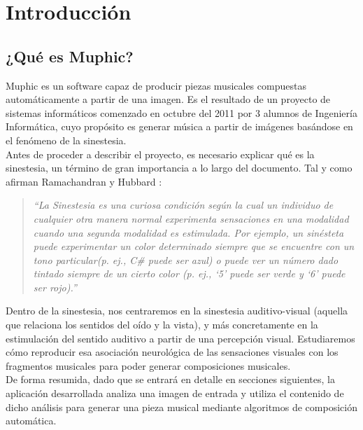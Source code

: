 \chapter{Introducción}
\label{chap:intro}



	\section{¿Qué es Muphic?}
	\label{sec:quees}
	
		\vspace{0.2in}
		Muphic es un software capaz de producir piezas musicales compuestas automáticamente a partir de una imagen. Es el resultado de un proyecto de sistemas informáticos comenzado en octubre del 2011 por 3 alumnos de Ingeniería Informática, cuyo propósito es generar música a partir de imágenes basándose en el fenómeno de la sinestesia.\\
		
		Antes de proceder a describir el proyecto, es necesario explicar qué es la sinestesia, un término de gran importancia a lo largo del documento. Tal y como afirman Ramachandran y Hubbard \cite{paperSyn}:
		
		\begin{quote}
		\emph{``La Sinestesia es una curiosa condición según la cual un individuo de cualquier otra manera normal experimenta sensaciones en una modalidad cuando una segunda modalidad es estimulada. Por ejemplo, un sinésteta puede experimentar un color determinado siempre que se encuentre con un tono particular(p. ej., C\# puede ser azul) o puede ver un número dado tintado siempre de un cierto color (p. ej., ‘5’ puede ser verde y ‘6’ puede ser rojo).''}
		\end{quote}
		
		Dentro de la sinestesia, nos centraremos en la sinestesia auditivo-visual (aquella que relaciona los sentidos del oído y la vista), y más concretamente en la estimulación del sentido auditivo a partir de una percepción visual. Estudiaremos cómo reproducir esa asociación neurológica de las sensaciones visuales con los fragmentos musicales para poder generar composiciones musicales.\\
		 
		
		De forma resumida, dado que se entrará en detalle en secciones siguientes, la aplicación desarrollada analiza una imagen de entrada y utiliza el contenido de dicho análisis para generar una pieza musical mediante algoritmos de composición automática.\\


